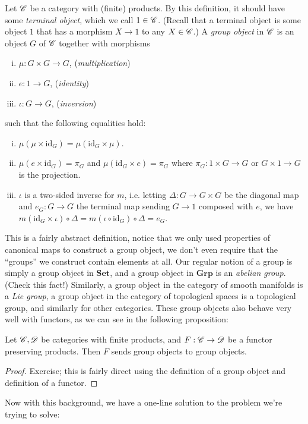 \begin{solution}
    \begin{definition}
        Let $\mathscr{C}$ be a category with (finite) products. By this definition, it should have some \emph{terminal object}, which we call $1\in \mathscr{C}$. (Recall that a terminal object is some object $1$ that has a morphism $X \to 1$ to any $X\in \mathscr{C}$.) A \emph{group object} in $\mathscr{C}$ is an object $G$ of $\mathscr{C}$ together with morphisms
        \begin{enumerate}[(i)]
            \item $\mu : G\times  G \to G$, (\emph{multiplication})
            \item $e : 1 \to G$, (\emph{identity})
            \item $\iota : G \to G$, (\emph{inversion})
        \end{enumerate}
        such that the following equalities hold:
        \begin{enumerate}[(i)]
            \item $\mu(\mu\times \textrm{id}_G) = \mu(\textrm{id}_G \times \mu)$. 
            \item $\mu(e\times \textrm{id}_G) = \pi_G$ and $\mu(\textrm{id}_G \times e) = \pi_G$ where $\pi_G : 1\times G \to G$ or $G\times 1\to G$ is the projection.
            \item $\iota$ is a two-sided inverse for $m$, i.e. letting $\Delta : G \to G\times G$ be the diagonal map and $e_G : G\to G$ the terminal map sending $G \to 1$ composed with $e$, we have $m(\textrm{id}_G \times \iota)\circ \Delta = m(\iota \circ \textrm{id}_G)\circ \Delta = e_G$. 
        \end{enumerate}
    \end{definition}
    This is a fairly abstract definition, notice that we only used properties of canonical maps to construct a group object, we don't even require that the ``groups'' we construct contain elements at all. Our regular notion of a group is simply a group object in $\textbf{Set}$, and a group object in $\textbf{Grp}$ is an \emph{abelian group}. (Check this fact!) Similarly, a group object in the category of smooth manifolds is a \emph{Lie group}, a group object in the category of topological spaces is a topological group, and similarly for other categories. These group objects also behave very well with functors, as we can see in the following proposition: 

    \begin{claim}
        Let $\mathscr{C}, \mathscr{D}$ be categories with finite products, and $F : \mathscr{C} \to \mathscr{D}$ be a functor preserving products. Then $F$ sends group objects to group objects.
    \end{claim}
    \begin{proof}
        Exercise; this is fairly direct using the definition of a group object and definition of a functor.
    \end{proof}
    Now with this background, we have a one-line solution to the problem we're trying to solve:


\end{solution}
